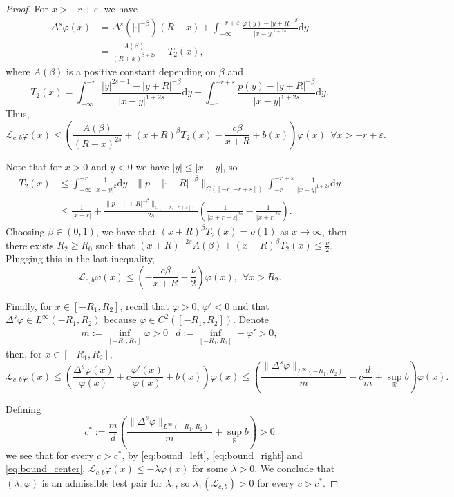 \documentclass[11pt,a4paper]{amsart}
\newcommand{\Lop}{\mathcal{L}}
\newcommand{\R}{\mathbb{R}}
\newcommand{\dy}{\mathrm{d}y}
\renewcommand{\phi}{\varphi}
\renewcommand{\epsilon}{\varepsilon}
\begin{document}
\begin{proof}
For $x > -r +\epsilon$, we have
\begin{align*}
\Delta^s \phi(x) &= \Delta^s(|\cdot|^{-\beta}) (R+x) + \int_{-\infty}^{-r+\epsilon} \frac{\phi(y) - |y+R|^{-\beta}}{|x-y|^{1+2s}}\dy\\
&= \frac{A(\beta)}{(R+x)^{\beta + 2s}} + T_2(x),
\end{align*}
where $A(\beta)$ is a positive constant depending on $\beta$ and
\[T_2(x) = \int_{-\infty}^{-r} \frac{|y|^{2s-1} -|y+R|^{-\beta} }{|x-y|^{1+2s}}\dy + \int_{-r}^{-r+\epsilon}\frac{p(y) - |y+R|^{-\beta}}{|x-y|^{1+2s}}\dy.\]
Thus,
\[\Lop_{c,b} \phi(x) \leq \left( \frac{A(\beta)}{(R+x)^{2s}} + (x+R)^{\beta} T_2(x) - \frac{c \beta}{x + R} + b(x)\right)\phi(x) ~~\forall x>-r+\epsilon.\]

Note that for $x>0$ and $y<0$ we have $|y| \leq |x-y|$, so  
\begin{align*}
T_2(x) &\leq \int_{-\infty}^{-r} \frac{1}{|x-y|^2} \dy + \|p-|\cdot +R|^{-\beta}\|_{C([-r, -r+\epsilon])}\int_{-r}^{-r+\epsilon}\frac{1}{|x-y|^{1+2s}}\dy \\
&\leq \frac{1}{|x+r|} + \frac{\|p-|\cdot +R|^{-\beta}\|_{C([-r, -r+\epsilon])}}{2s} \left( \frac{1}{|x+r-\epsilon|^{2s}} - \frac{1}{|x+r|^{2s}}\right).
\end{align*}
Choosing $\beta \in (0,1)$, we have that $(x+R)^{\beta} T_2(x) = o(1)$ as $x\rightarrow \infty$, then there exists $R_2 \geq R_0$ such that $(x+R)^{-2s}A(\beta) + (x+R)^{\beta} T_2(x) \leq \frac{\nu}{2}$. Plugging this in the last inequality,
\begin{equation}
\label{eq:bound_right}
\Lop_{c,b} \phi(x) \leq \left( - \frac{c \beta}{x + R} -\frac{\nu}{2} \right)\phi(x),~~ \forall x > R_2.
\end{equation}

Finally, for $x\in [-R_1, R_2]$, recall that $\phi >0$, $\phi' <0$ and that $\Delta^s\phi\in L^{\infty}(-R_1, R_2)$ because $\phi\in C^2([-R_1, R_2])$. Denote 
\[\begin{array}{cc}
m:= \inf_{[-R_1, R_2]} \phi > 0 & d := \inf_{[-R_1, R_2]} -\phi' >0,
\end{array}\]
then, for $x\in[-R_1,R_2]$,
\begin{equation}
\label{eq:bound_center}
\Lop_{c,b}\phi(x) \leq \left(\frac{\Delta^s \phi(x)}{\phi(x)} + c\frac{\phi'(x)}{\phi(x)} + b(x) \right) \phi(x) \leq \left(\frac{\|\Delta^s\phi\|_{L^{\infty}(-R_1, R_2)}}{m} - c\frac{d}{m} + \sup_{\R} b\right) \phi(x).
\end{equation}

Defining
\[c^*:= \frac{m}{d}\left(\frac{\|\Delta^s\phi\|_{L^{\infty}(-R_1, R_2)}}{m} + \sup_{\R} b\right)>0\]
we see that for every $c>c^*$, by \eqref{eq:bound_left}, \eqref{eq:bound_right} and \eqref{eq:bound_center}, $\Lop_{c,b} \phi(x) \leq -\lambda \phi(x)$ for some $\lambda >0$. We conclude that $(\lambda, \phi)$ is an admissible test pair for $\lambda_1$, so $\lambda_1(\Lop_{c,b})>0$ for every $c>c^*$. 
\end{proof}
\end{document}
